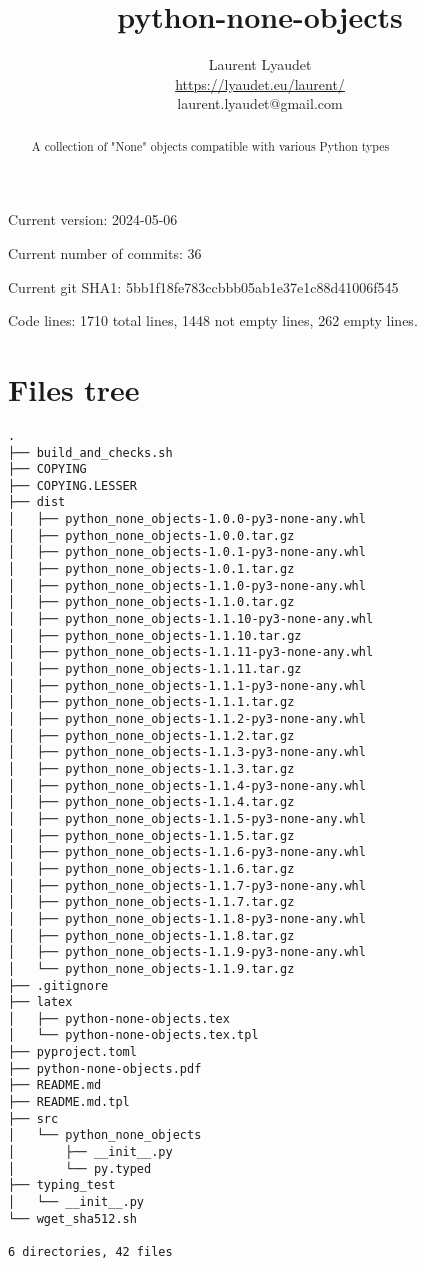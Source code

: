 \documentclass{article}
\begin{document}
\author{
  Laurent Lyaudet\\
  \url{https://lyaudet.eu/laurent/}\\
  laurent.lyaudet@gmail.com
}
\title{python-none-objects}

\maketitle
\begin{abstract}
A collection of "None" objects
compatible with various Python types
\end{abstract}

Current version: 2024-05-06

Current number of commits: 36

Current git SHA1: 5bb1f18fe783ccbbb05ab1e37e1c88d41006f545

Code lines: 1710 total lines, 1448 not empty lines, 262 empty lines.

\section{Files tree}
\label{section:tree}

\begin{verbatim}
.
├── build_and_checks.sh
├── COPYING
├── COPYING.LESSER
├── dist
│   ├── python_none_objects-1.0.0-py3-none-any.whl
│   ├── python_none_objects-1.0.0.tar.gz
│   ├── python_none_objects-1.0.1-py3-none-any.whl
│   ├── python_none_objects-1.0.1.tar.gz
│   ├── python_none_objects-1.1.0-py3-none-any.whl
│   ├── python_none_objects-1.1.0.tar.gz
│   ├── python_none_objects-1.1.10-py3-none-any.whl
│   ├── python_none_objects-1.1.10.tar.gz
│   ├── python_none_objects-1.1.11-py3-none-any.whl
│   ├── python_none_objects-1.1.11.tar.gz
│   ├── python_none_objects-1.1.1-py3-none-any.whl
│   ├── python_none_objects-1.1.1.tar.gz
│   ├── python_none_objects-1.1.2-py3-none-any.whl
│   ├── python_none_objects-1.1.2.tar.gz
│   ├── python_none_objects-1.1.3-py3-none-any.whl
│   ├── python_none_objects-1.1.3.tar.gz
│   ├── python_none_objects-1.1.4-py3-none-any.whl
│   ├── python_none_objects-1.1.4.tar.gz
│   ├── python_none_objects-1.1.5-py3-none-any.whl
│   ├── python_none_objects-1.1.5.tar.gz
│   ├── python_none_objects-1.1.6-py3-none-any.whl
│   ├── python_none_objects-1.1.6.tar.gz
│   ├── python_none_objects-1.1.7-py3-none-any.whl
│   ├── python_none_objects-1.1.7.tar.gz
│   ├── python_none_objects-1.1.8-py3-none-any.whl
│   ├── python_none_objects-1.1.8.tar.gz
│   ├── python_none_objects-1.1.9-py3-none-any.whl
│   └── python_none_objects-1.1.9.tar.gz
├── .gitignore
├── latex
│   ├── python-none-objects.tex
│   └── python-none-objects.tex.tpl
├── pyproject.toml
├── python-none-objects.pdf
├── README.md
├── README.md.tpl
├── src
│   └── python_none_objects
│       ├── __init__.py
│       └── py.typed
├── typing_test
│   └── __init__.py
└── wget_sha512.sh

6 directories, 42 files
\end{verbatim}
\end{document}
